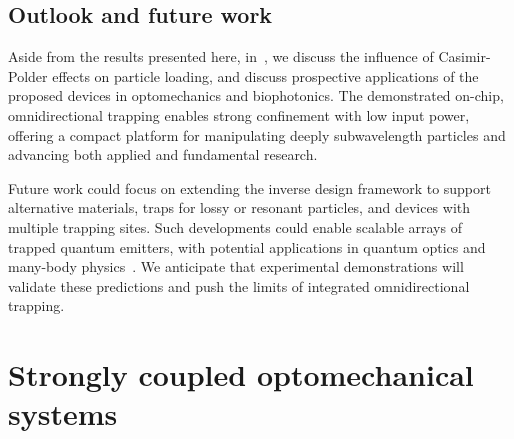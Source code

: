 \subsection*{Outlook and future work}

Aside from the results presented here, in~\cite{ownpub2}, we discuss the influence of Casimir-Polder effects
 on particle loading, and discuss prospective applications of the proposed devices in optomechanics and biophotonics. The demonstrated on-chip, omnidirectional trapping enables strong confinement with low input power, offering a compact platform for manipulating deeply subwavelength particles and advancing both applied and fundamental research.

Future work could focus on extending the inverse design framework to support alternative materials, 
traps for lossy or resonant particles, and devices with multiple trapping sites.
 Such developments could enable scalable arrays of trapped quantum emitters, with potential applications
  in quantum optics and many-body physics~\cite{chang_colloquium_2018}. We anticipate that experimental demonstrations
   will validate these predictions and push the limits of integrated omnidirectional trapping.

\section{Strongly coupled optomechanical systems~\cite{ownpub5}}\label{sec:mech_strongly_coupled}

